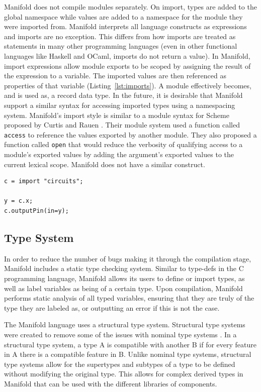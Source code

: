 Manifold does not compile modules separately. On import, types
are added to the global namespace while values are added to a namespace for the
module they were imported from. Manifold interprets all language constructs as
expressions and imports are no exception. This differs from how imports are
treated as statements in many other
programming languages (even in other functional languages like Haskell and
OCaml, imports do not return a value). In Manifold, import expressions allow module
exports to be scoped by assigning the result of the expression
to a variable. The imported values are then referenced as properties of that
variable (Listing~\ref{lst:imports}). A module effectively becomes, and is used as,
a
record data type. In the future, it is desirable that Manifold support a
similar syntax for accessing imported types using a namespacing system.
Manifold's import style is similar to a module syntax for Scheme proposed by
Curtis and Rauen \cite{Curtis:1990:MSS:91556.91573}. Their module system used
a function called \texttt{access} to reference the values exported by another
module. They also proposed a function called \texttt{open} that would reduce
the verbosity of qualifying access to a module's exported values by adding the
argument's exported values to the current lexical scope. Manifold does not
have a similar construct.

\begin{lstlisting}[label=lst:imports, caption=A module imported into a Manifold file]
c = import "circuits";

y = c.x;
c.outputPin(in=y);
\end{lstlisting}

\subsection{Type System}

In order to reduce the number of bugs making it through the compilation stage,
Manifold includes a static type checking system. Similar to type-defs in the C
programming language, Manifold allows its users to define or import types,
as well as label variables as being of a certain type. Upon compilation,
Manifold performs static analysis of all typed variables, ensuring that they are
truly of the type they are labeled as, or outputting an error if this is not the
case.

The Manifold language uses a structural type system. Structural type systems were
created to remove some of the issues with nominal type systems
\cite{Gil:2008:WIS:1449764.1449771}. In a structural
type system, a type A is compatible with another B if for every feature in
A there is a compatible feature in B. Unlike nominal type systems, structural
type systems allow for the supertypes and subtypes of a type to be defined without
modifying the original type. This allows for complex derived types in Manifold that
can be used with the different libraries of components.

